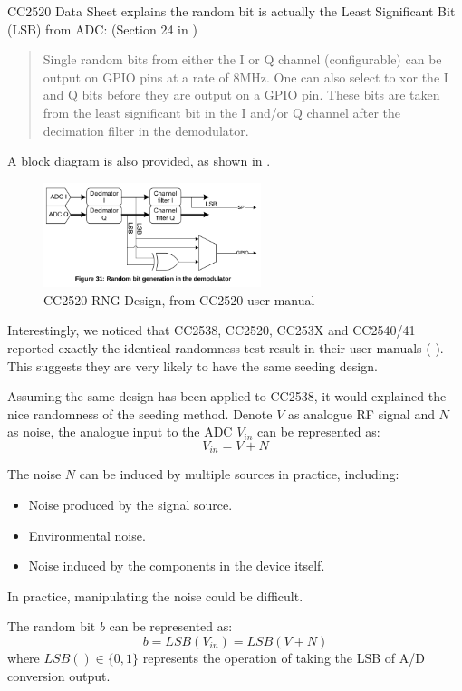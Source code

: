 CC2520 Data Sheet\cite{CC2520Manual} explains the random bit is actually the Least Significant Bit (LSB) from ADC: (Section 24 in \cite{CC2520Manual})
\begin{quote}
Single random bits from either the I or Q channel (configurable) can be output on GPIO pins at a rate of 8MHz. One can also select to xor the I and Q bits before they are output on a GPIO pin. These bits are taken from the least significant bit in the I and/or Q channel after the decimation filter in the demodulator.
\end{quote}

A block diagram is also provided, as shown in .
\begin{figure}[!t]
\centering
\includegraphics[width=2.5in]{fig/CC2520_RNG.png}
\caption{CC2520 RNG Design, from CC2520 user manual\cite{CC2520Manual}}
\label{CC2520RFRND}
\end{figure}

Interestingly, we noticed that CC2538, CC2520, CC253X and CC2540/41 reported exactly the identical randomness test result in their user manuals (\cite{CC2538Manual} \cite{ CC2520Manual} \cite{CC2530Manual}). This suggests they are very likely to have the same seeding design.

Assuming the same design has been applied to CC2538, it would explained the nice randomness of the seeding method. Denote $V$ as analogue RF signal and $N$ as noise, the analogue input to the ADC $V_{in}$ can be represented as:
\begin{equation}
V_{in} = V + N
\end{equation}

The noise $N$ can be induced by multiple sources in practice, including:
\begin{itemize}
\item Noise produced by the signal source.
\item Environmental noise.
\item Noise induced by the components in the device itself.
\end{itemize}
In practice, manipulating the noise could be difficult.

The random bit $b$ can be represented as:
\begin{equation} \label{RNDOutput}
b = LSB(V_{in}) = LSB(V + N)
\end{equation}
where $LSB() \in \{0,1\}$ represents the operation of taking the LSB of A/D conversion output.


